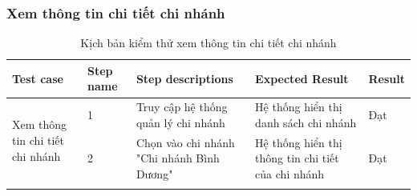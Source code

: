 \subsubsection{ Xem thông tin chi tiết chi nhánh}
{
    \setlength\extrarowheight{6pt}
    \begin{longtable}{| p{2.5cm}| p{1cm}| p{5.5cm}| p{4.5cm} | p{1.5cm} |}
        \hline
        \textbf{Test case}                                        & \textbf{Step name} & \textbf{Step descriptions}                & \textbf{Expected Result}                           & \textbf{Result} \\
        \hline
        \multirow[t]{2}{2.5cm}{ Xem thông tin chi tiết chi nhánh} & 1                  & Truy cập hệ thống quản lý chi nhánh       & Hệ thống hiển thị danh sách chi nhánh              & Đạt             \\
        \cline{2-5}
                                                                  & 2                  & Chọn vào chi nhánh "Chi nhánh Bình Dương" & Hệ thống hiển thị thông tin chi tiết của chi nhánh & Đạt             \\
        \hline
        \caption{Kịch bản kiểm thử xem thông tin chi tiết chi nhánh}
    \end{longtable}
}

